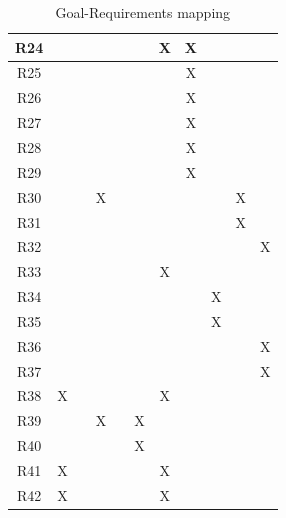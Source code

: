 \documentclass[12pt]{report}
\begin{document}
\begin{table}[h]
\begin{tabular}{|c|c|c|c|c|c|c|c|c|c|c|}
R24 &    &    &    &    &    & X  & X  &    &    &     \\ \hline
R25 &    &    &    &    &    &    & X  &    &    &     \\ \hline
R26 &    &    &    &    &    &    & X  &    &    &     \\ \hline
R27 &    &    &    &    &    &    & X  &    &    &     \\ \hline
R28 &    &    &    &    &    &    & X  &    &    &     \\ \hline
R29 &    &    &    &    &    &    & X  &    &    &     \\ \hline
R30 &    &    & X  &    &    &    &    &    & X  &     \\ \hline
R31 &    &    &    &    &    &    &    &    & X  &     \\ \hline
R32 &    &    &    &    &    &    &    &    &    & X   \\ \hline
R33 &    &    &    &    &    & X  &    &    &    &     \\ \hline
R34 &    &    &    &    &    &    &    & X  &    &     \\ \hline
R35 &    &    &    &    &    &    &    & X  &    &     \\ \hline
R36 &    &    &    &    &    &    &    &    &    & X   \\ \hline
R37 &    &    &    &    &    &    &    &    &    & X   \\ \hline
R38 & X  &    &    &    &    & X  &    &    &    &     \\ \hline
R39 &    &    & X  &    & X  &    &    &    &    &     \\ \hline
R40 &    &    &    &    & X  &    &    &    &    &     \\ \hline
R41 & X  &    &    &    &    & X  &    &    &    &     \\ \hline
R42 & X  &    &    &    &    & X  &    &    &    &     \\ \hline
\end{tabular}
\caption{Goal-Requirements mapping}
\end{table}
\clearpage
\end{document}
